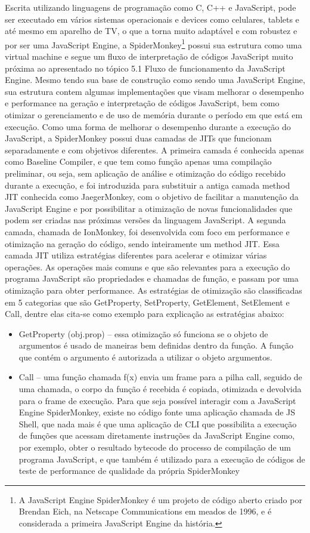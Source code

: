 \documentclass{article}
\begin{document}
Escrita utilizando linguagens de programação como C, C++ e JavaScript, pode ser
executado em vários sistemas operacionais e devices como celulares, tablets e até mesmo
em aparelho de TV, o que a torna muito adaptável e com robustez e por ser uma JavaScript
Engine, a SpiderMonkey\footnote{A JavaScript Engine SpiderMonkey é um projeto de código aberto criado por Brendan Eich, na Netscape
Communications em meados de 1996, e é considerada a primeira JavaScript Engine da história.} possui sua estrutura como uma virtual machine e segue um fluxo
de interpretação de códigos JavaScript muito próxima ao apresentado no tópico 5.1 Fluxo
de funcionamento da JavaScript Engine.
Mesmo tendo sua base de construção como sendo uma JavaScript Engine, sua estrutura
contem algumas implementações que visam melhorar o desempenho e performance na
geração e interpretação de códigos JavaScript, bem como otimizar o gerenciamento e de
uso de memória durante o período em que está em execução.
Como uma forma de melhorar o desempenho durante a execução do JavaScript, a
SpiderMonkey possui duas camadas de JITs que funcionam separadamente e com objetivos
diferentes. A primeira camada é conhecida apenas como Baseline Compiler, e que tem como
função apenas uma compilação preliminar, ou seja, sem aplicação de análise e otimização
do código recebido durante a execução, e foi introduzida para substituir a antiga camada
method JIT conhecida como JaegerMonkey, com o objetivo de facilitar a manutenção da
JavaScript Engine e por possibilitar a otimização de novas funcionalidades que podem ser
criadas nas próximas versões da linguagem JavaScript.
A segunda camada, chamada de IonMonkey, foi desenvolvida com foco em performance e
otimização na geração do código, sendo inteiramente um method JIT. Essa camada JIT
utiliza estratégias diferentes para acelerar e otimizar várias operações. As operações mais
comuns e que são relevantes para a execução do programa JavaScript são propriedades e
chamadas de função, e passam por uma otimização para obter performance. As estratégias
de otimização são classificadas em 5 categorias que são GetProperty, SetProperty,
GetElement, SetElement e Call, dentre elas cita-se como exemplo para explicação as
estratégias abaixo:

\begin{itemize}
\item GetProperty (obj.prop) – essa otimização só funciona se o objeto de argumentos é
usado de maneiras bem definidas dentro da função. A função que contém o
argumento é autorizada a utilizar o objeto argumentos.
\item Call – uma função chamada f(x) envia um frame para a pilha call, seguido de uma
chamada, o corpo da função é recebida é copiada, otimizada e devolvida para o
frame de execução.
Para que seja possível interagir com a JavaScript Engine SpiderMonkey, existe no código
fonte uma aplicação chamada de JS Shell, que nada mais é que uma aplicação de CLI que
possibilita a execução de funções que acessam diretamente instruções da JavaScript
Engine como, por exemplo, obter o resultado bytecode do processo de compilação de um
programa JavaScript, e que também é utilizado para a execução de códigos de teste de
performance de qualidade da própria SpiderMonkey
\end{itemize}
\end{document}
